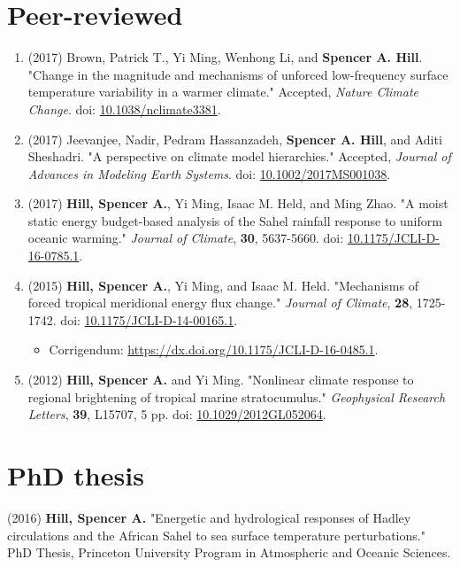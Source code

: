 \documentclass[12pt,letterpaper]{shillcv}
\begin{document}
\section*{Peer-reviewed}
\label{sec:orgf1d4b6b}
\begin{enumerate}
\item (2017) Brown, Patrick T., Yi Ming, Wenhong Li, and \textbf{Spencer A. Hill}.  "Change
in the magnitude and mechanisms of unforced low-frequency surface temperature
variability in a warmer climate."  Accepted, \emph{Nature Climate Change}.  doi:
\href{https://doi.org/10.1038/nclimate3381}{10.1038/nclimate3381}.
\item (2017) Jeevanjee, Nadir, Pedram Hassanzadeh, \textbf{Spencer A. Hill}, and Aditi
Sheshadri.  "A perspective on climate model hierarchies."  Accepted, \emph{Journal
of Advances in Modeling Earth Systems}.  doi: \href{https://doi.org/10.1002/2017MS001038}{10.1002/2017MS001038}.
\item (2017) \textbf{Hill, Spencer A.}, Yi Ming, Isaac M. Held, and Ming Zhao.  "A moist
static energy budget-based analysis of the Sahel rainfall response to uniform
oceanic warming."  \emph{Journal of Climate}, \textbf{30}, 5637-5660.  doi:
\href{https://doi.org/10.1175/JCLI-D-16-0785.1}{10.1175/JCLI-D-16-0785.1}.
\item (2015) \textbf{Hill, Spencer A.}, Yi Ming, and Isaac M. Held.  "Mechanisms of forced
tropical meridional energy flux change."  \emph{Journal of Climate}, \textbf{28}, 1725-1742.
doi: \href{http://dx.doi.org/10.1175/JCLI-D-14-00165.1}{10.1175/JCLI-D-14-00165.1}.
\begin{itemize}
\item Corrigendum: \url{https://dx.doi.org/10.1175/JCLI-D-16-0485.1}.
\end{itemize}
\item (2012) \textbf{Hill, Spencer A.} and Yi Ming.  "Nonlinear climate response to regional
brightening of tropical marine stratocumulus."  \emph{Geophysical Research Letters},
\textbf{39}, L15707, 5 pp. doi:
\href{http://dx.doi.org/10.1029/2012GL052064}{10.1029/2012GL052064}.
\end{enumerate}
\section*{PhD thesis}
\label{sec:org0d3be07}
(2016) \textbf{Hill, Spencer A.} "Energetic and hydrological responses of Hadley
circulations and the African Sahel to sea surface temperature perturbations."
PhD Thesis, Princeton University Program in Atmospheric and Oceanic Sciences.
\end{document}
